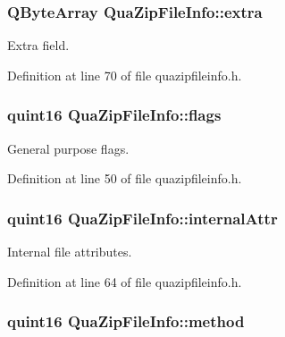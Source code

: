 \hypertarget{struct_qua_zip_file_info_affc7b097de2c3c2ef5801c60f96adc72}{
\subsubsection[{extra}]{\setlength{\rightskip}{0pt plus 5cm}Q\-Byte\-Array Qua\-Zip\-File\-Info\-::extra}}\label{struct_qua_zip_file_info_affc7b097de2c3c2ef5801c60f96adc72}


Extra field. 



Definition at line 70 of file quazipfileinfo.\-h.

\hypertarget{struct_qua_zip_file_info_a56d36f777e4fc892c71e22d080622e2c}{
\subsubsection[{flags}]{\setlength{\rightskip}{0pt plus 5cm}quint16 Qua\-Zip\-File\-Info\-::flags}}\label{struct_qua_zip_file_info_a56d36f777e4fc892c71e22d080622e2c}


General purpose flags. 



Definition at line 50 of file quazipfileinfo.\-h.

\hypertarget{struct_qua_zip_file_info_a36e681a93b041617addee78cb939c93d}{
\subsubsection[{internal\-Attr}]{\setlength{\rightskip}{0pt plus 5cm}quint16 Qua\-Zip\-File\-Info\-::internal\-Attr}}\label{struct_qua_zip_file_info_a36e681a93b041617addee78cb939c93d}


Internal file attributes. 



Definition at line 64 of file quazipfileinfo.\-h.

\hypertarget{struct_qua_zip_file_info_af5c1bbda7f5dec2c358e7a543564de4c}{
\subsubsection[{method}]{\setlength{\rightskip}{0pt plus 5cm}quint16 Qua\-Zip\-File\-Info\-::method}}\label{struct_qua_zip_file_info_af5c1bbda7f5dec2c358e7a543564de4c}


